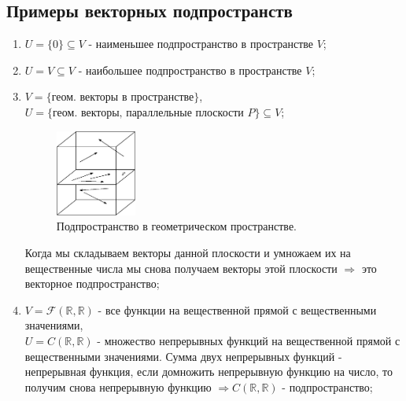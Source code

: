 \documentclass[12pt]{article}
\newcommand{\MR}{\mathbb{R}}
\newcommand{\MF}{\mathcal{F}}
\theoremstyle{definition}
\begin{document}
\subsection*{Примеры векторных подпространств}
\begin{enumerate}[label=(\arabic*)]
	\item $U = \{0\} \subseteq V$ - наименьшее подпространство в пространстве $V$;
	\item $U = V \subseteq V$ - наибольшее подпространство в пространстве $V$;
	\item $V = \{\text{геом. векторы в пространстве}\}$, $U = \{\text{геом. векторы, параллельные плоскости } P\} \subseteq V$;
	\begin{figure}[H]
		\centering
		\includegraphics[width=0.25\textwidth]{LAL2_1.eps}
		\caption{Подпространство в геометрическом пространстве.}
		\label{2_1}
	\end{figure}
	Когда мы складываем векторы данной плоскости и умножаем их на вещественные числа мы снова получаем векторы этой плоскости $\Rightarrow$ это векторное подпространство;
	\item $V = \MF(\MR,\MR)$ - все функции на вещественной прямой с вещественными значениями, \\
	$U = C(\MR,\MR)$ - множество непрерывных функций на вещественной прямой с вещественными значениями. Сумма двух непрерывных функций - непрерывная функция, если домножить непрерывную функцию на число, то получим снова непрерывную функцию $\Rightarrow C(\MR,\MR)$ - подпространство;
\end{enumerate}
\end{document}
